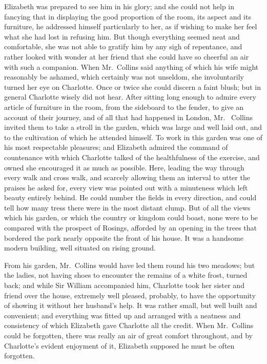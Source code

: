 Elizabeth was prepared to see him in his glory; and she could
not help in fancying that in displaying the good proportion of
the room, its aspect and its furniture, he addressed himself
particularly to her, as if wishing to make her feel what she
had lost in refusing him.  But though everything seemed neat
and comfortable, she was not able to gratify him by any sigh of
repentance, and rather looked with wonder at her friend that
she could have so cheerful an air with such a companion.  When
Mr.\ Collins said anything of which his wife might reasonably be
ashamed, which certainly was not unseldom, she involuntarily
turned her eye on Charlotte.  Once or twice she could discern
a faint blush; but in general Charlotte wisely did not hear.
After sitting long enough to admire every article of furniture in
the room, from the sideboard to the fender, to give an account
of their journey, and of all that had happened in London, Mr.\ %
Collins invited them to take a stroll in the garden, which was
large and well laid out, and to the cultivation of which he
attended himself.  To work in this garden was one of his most
respectable pleasures; and Elizabeth admired the command of
countenance with which Charlotte talked of the healthfulness of
the exercise, and owned she encouraged it as much as possible.
Here, leading the way through every walk and cross walk, and
scarcely allowing them an interval to utter the praises he asked
for, every view was pointed out with a minuteness which left
beauty entirely behind.  He could number the fields in every
direction, and could tell how many tress there were in the most
distant clump.  But of all the views which his garden, or which
the country or kingdom could boast, none were to be compared
with the prospect of Rosings, afforded by an opening in the trees
that bordered the park nearly opposite the front of his house.  It
was a handsome modern building, well situated on rising ground.

From his garden, Mr.\ Collins would have led them round his two
meadows; but the ladies, not having shoes to encounter the
remains of a white frost, turned back; and while Sir William
accompanied him, Charlotte took her sister and friend over the
house, extremely well pleased, probably, to have the opportunity
of showing it without her husband's help.  It was rather small,
but well built and convenient; and everything was fitted up and
arranged with a neatness and consistency of which Elizabeth
gave Charlotte all the credit.  When Mr.\ Collins could be
forgotten, there was really an air of great comfort throughout,
and by Charlotte's evident enjoyment of it, Elizabeth supposed
he must be often forgotten.

